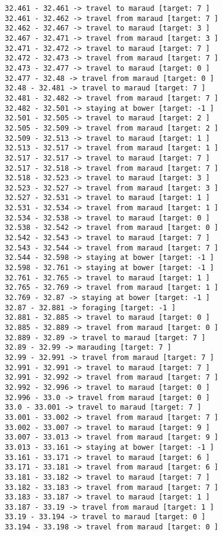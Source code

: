 \documentclass[11pt]{article}
\begin{document}
\begin{Verbatim}[commandchars=\\\{\}]
32.461 - 32.461 -> travel to maraud [target: 7 ]
32.461 - 32.462 -> travel from maraud [target: 7 ]
32.462 - 32.467 -> travel to maraud [target: 3 ]
32.467 - 32.471 -> travel from maraud [target: 3 ]
32.471 - 32.472 -> travel to maraud [target: 7 ]
32.472 - 32.473 -> travel from maraud [target: 7 ]
32.473 - 32.477 -> travel to maraud [target: 0 ]
32.477 - 32.48 -> travel from maraud [target: 0 ]
32.48 - 32.481 -> travel to maraud [target: 7 ]
32.481 - 32.482 -> travel from maraud [target: 7 ]
32.482 - 32.501 -> staying at bower [target: -1 ]
32.501 - 32.505 -> travel to maraud [target: 2 ]
32.505 - 32.509 -> travel from maraud [target: 2 ]
32.509 - 32.513 -> travel to maraud [target: 1 ]
32.513 - 32.517 -> travel from maraud [target: 1 ]
32.517 - 32.517 -> travel to maraud [target: 7 ]
32.517 - 32.518 -> travel from maraud [target: 7 ]
32.518 - 32.523 -> travel to maraud [target: 3 ]
32.523 - 32.527 -> travel from maraud [target: 3 ]
32.527 - 32.531 -> travel to maraud [target: 1 ]
32.531 - 32.534 -> travel from maraud [target: 1 ]
32.534 - 32.538 -> travel to maraud [target: 0 ]
32.538 - 32.542 -> travel from maraud [target: 0 ]
32.542 - 32.543 -> travel to maraud [target: 7 ]
32.543 - 32.544 -> travel from maraud [target: 7 ]
32.544 - 32.598 -> staying at bower [target: -1 ]
32.598 - 32.761 -> staying at bower [target: -1 ]
32.761 - 32.765 -> travel to maraud [target: 1 ]
32.765 - 32.769 -> travel from maraud [target: 1 ]
32.769 - 32.87 -> staying at bower [target: -1 ]
32.87 - 32.881 -> foraging [target: -1 ]
32.881 - 32.885 -> travel to maraud [target: 0 ]
32.885 - 32.889 -> travel from maraud [target: 0 ]
32.889 - 32.89 -> travel to maraud [target: 7 ]
32.89 - 32.99 -> marauding [target: 7 ]
32.99 - 32.991 -> travel from maraud [target: 7 ]
32.991 - 32.991 -> travel to maraud [target: 7 ]
32.991 - 32.992 -> travel from maraud [target: 7 ]
32.992 - 32.996 -> travel to maraud [target: 0 ]
32.996 - 33.0 -> travel from maraud [target: 0 ]
33.0 - 33.001 -> travel to maraud [target: 7 ]
33.001 - 33.002 -> travel from maraud [target: 7 ]
33.002 - 33.007 -> travel to maraud [target: 9 ]
33.007 - 33.013 -> travel from maraud [target: 9 ]
33.013 - 33.161 -> staying at bower [target: -1 ]
33.161 - 33.171 -> travel to maraud [target: 6 ]
33.171 - 33.181 -> travel from maraud [target: 6 ]
33.181 - 33.182 -> travel to maraud [target: 7 ]
33.182 - 33.183 -> travel from maraud [target: 7 ]
33.183 - 33.187 -> travel to maraud [target: 1 ]
33.187 - 33.19 -> travel from maraud [target: 1 ]
33.19 - 33.194 -> travel to maraud [target: 0 ]
33.194 - 33.198 -> travel from maraud [target: 0 ]

\end{Verbatim}
\end{document}
